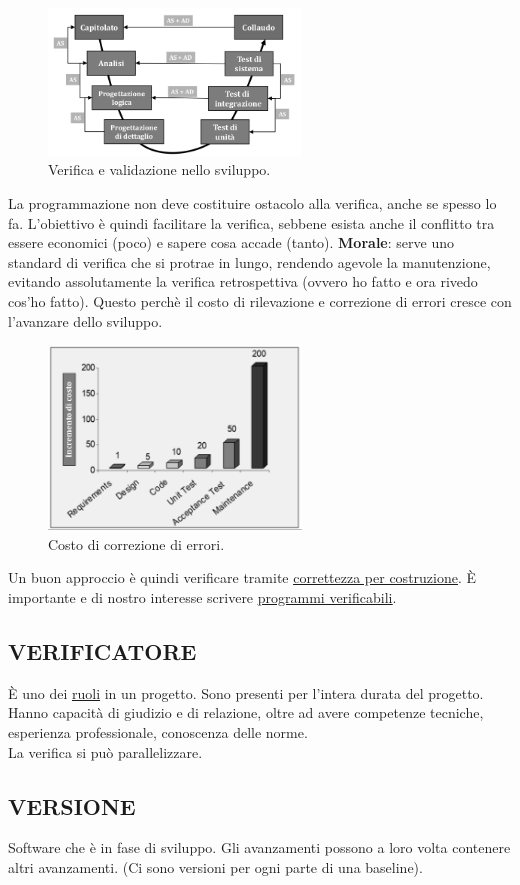		\begin{figure}[H]
			\centering
			\includegraphics[width=0.6\textwidth]{img/v}		
			\caption{Verifica e validazione nello sviluppo.}
			\label{V}
		\end{figure} 	
		La programmazione non deve costituire ostacolo alla verifica, anche se spesso lo fa. L'obiettivo è quindi facilitare la verifica, sebbene esista anche il conflitto tra essere economici (poco) e sapere cosa accade (tanto).
		\textbf{Morale}: serve uno standard di verifica che si protrae in lungo, rendendo agevole la manutenzione, evitando assolutamente la verifica retrospettiva (ovvero ho fatto e ora rivedo cos'ho fatto). Questo perchè il costo di rilevazione e correzione di errori cresce con l’avanzare dello sviluppo.	%
		
		\begin{figure}[H]
			\centering
			\includegraphics[width=0.6\textwidth]{img/costi}		
			\caption{Costo di correzione di errori.}
		\end{figure} 
		
		Un buon approccio è quindi verificare tramite \underline{\hyperref[byconstruction]{correttezza per costruzione}}. È importante e di nostro interesse scrivere \underline{\hyperref[programmiverificabili]{programmi verificabili}}.
			
		
		\subsection{VERIFICATORE}  \label{verificatore}
		È uno dei \underline{\hyperref[ruoli]{ruoli}} in un progetto. Sono presenti per l’intera durata del progetto. Hanno capacità di giudizio e di relazione, oltre ad avere competenze tecniche, esperienza professionale, conoscenza	delle norme. \\
		La verifica si può parallelizzare.
		
		\subsection{VERSIONE}  \label{versione}
		Software che è in fase di sviluppo. Gli avanzamenti possono a loro volta contenere altri avanzamenti. (Ci sono versioni per ogni parte di una baseline). 
	
	
